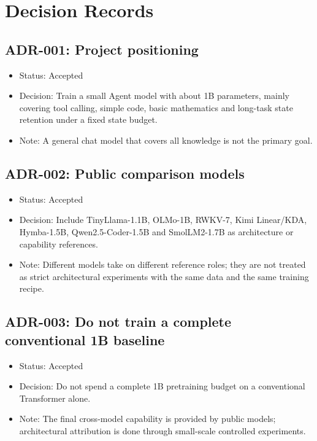 \section{Decision Records}

\subsection*{ADR-001: Project positioning}

\begin{itemize}
  \item Status: Accepted
  \item Decision: Train a small Agent model with about 1B parameters, mainly covering tool calling, simple code, basic mathematics and long-task state retention under a fixed state budget.
  \item Note: A general chat model that covers all knowledge is not the primary goal.
\end{itemize}

\subsection*{ADR-002: Public comparison models}

\begin{itemize}
  \item Status: Accepted
  \item Decision: Include TinyLlama-1.1B, OLMo-1B, RWKV-7, Kimi Linear/KDA, Hymba-1.5B, Qwen2.5-Coder-1.5B and SmolLM2-1.7B as architecture or capability references.
  \item Note: Different models take on different reference roles; they are not treated as strict architectural experiments with the same data and the same training recipe.
\end{itemize}

\subsection*{ADR-003: Do not train a complete conventional 1B baseline}

\begin{itemize}
  \item Status: Accepted
  \item Decision: Do not spend a complete 1B pretraining budget on a conventional Transformer alone.
  \item Note: The final cross-model capability is provided by public models; architectural attribution is done through small-scale controlled experiments.
\end{itemize}

